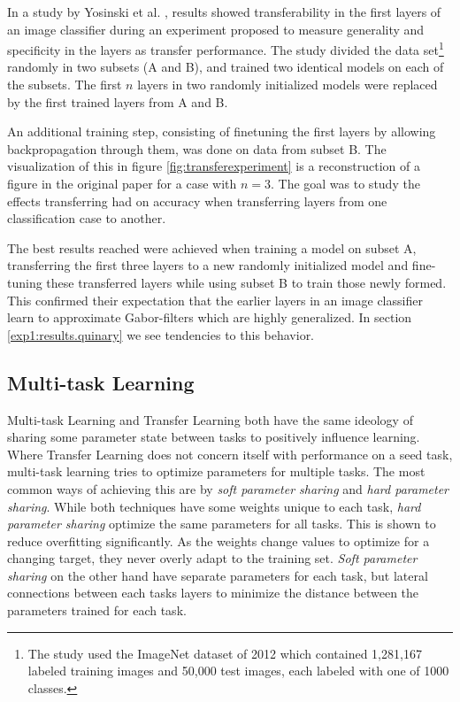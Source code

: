 In a study by Yosinski et al. \cite{yosinski2014transferable}, results showed transferability in the first layers of an image classifier during an experiment proposed to measure generality and specificity in the layers as transfer performance. The study divided the data set\footnote{The study used the ImageNet dataset of 2012 which contained 1,281,167 labeled training images and 50,000 test images, each labeled with one of 1000 classes.} randomly in two subsets (A and B), and trained two identical models on each of the subsets. The first \(n\) layers in two randomly initialized models were replaced by the first trained layers from A and B. 

An additional training step, consisting of finetuning the first layers by allowing backpropagation through them, was done on data from subset B. The visualization of this in figure \ref{fig:transferexperiment} is a reconstruction of a figure in the original paper for a case with \(n=3\). The goal was to study the effects transferring had on accuracy when transferring layers from one classification case to another. 

The best results reached were achieved when training a model on subset A, transferring the first three layers to a new randomly initialized model and fine-tuning these transferred layers while using subset B to train those newly formed. This confirmed their expectation that the earlier layers in an image classifier learn to approximate Gabor-filters which are highly generalized. In section \ref{exp1:results.quinary} we see tendencies to this behavior. 

\subsection{Multi-task Learning}
Multi-task Learning and Transfer Learning both have the same ideology of sharing some parameter state between tasks to positively influence learning. Where Transfer Learning does not concern itself with performance on a seed task, multi-task learning tries to optimize parameters for multiple tasks. The most common ways of achieving this are by \textit{soft parameter sharing} and \textit{hard parameter sharing}. While both techniques have some weights unique to each task, \textit{hard parameter sharing} optimize the same parameters for all tasks. This is shown to reduce overfitting\cite{hardparametersharing} significantly. As the weights change values to optimize for a changing target, they never overly adapt to the training set. \textit{Soft parameter sharing} on the other hand have separate parameters for each task, but lateral connections between each tasks layers to minimize the distance between the parameters trained for each task.

